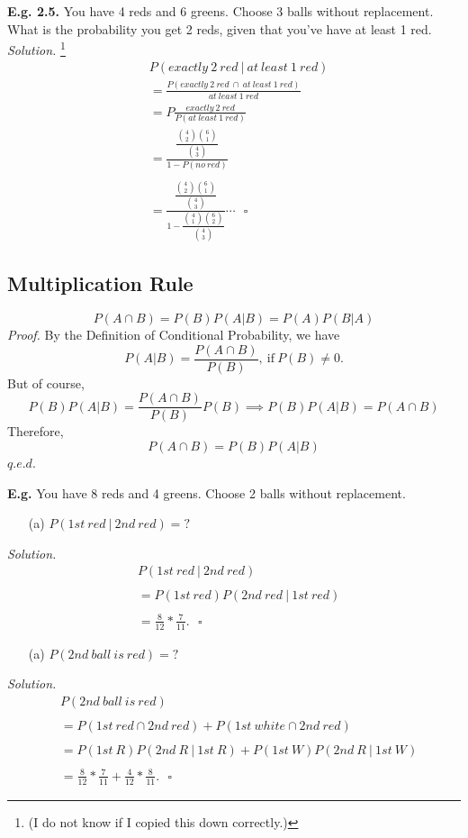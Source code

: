 \documentclass[12pt]{book}
\begin{document}
\noindent \textbf{E.g. 2.5. } You have 4 reds and 6 greens. Choose 3 balls without replacement. What is the probability you get 2 reds, given that you've have at least 1 red. \\
\textit{Solution. }\footnote{(I do not know if I copied this down correctly.)}
\begin{align*}
& P(exactly~2~red~|~at~least~1~red)\\
&= \frac{P(exactly~2~red~\cap~at~least~1~red)}{at~least~1~red}\\
&= P\frac{exactly~2~red}{P(at~least~1~red)}\\
&= \frac{\dfrac{{4\choose 2}{6\choose1}}{{4\choose3}}}{1-P(no~red)}\\\\
&= \frac{\dfrac{{4\choose 2}{6\choose1}}{{4\choose3}}}{1-\dfrac{{4\choose 1}{6\choose2}}{{4\choose3}}}\cdots~~~\square
\end{align*}


\subsection{Multiplication Rule}
$$\boxed{P(A\cap B)=P(B)P(A|B)=P(A)P(B|A)}$$
\textit{Proof. } By the Definition of Conditional Probability, we have
$$P(A|B)=\frac{P(A\cap B)}{P(B)},~\text{if}~P(B)\neq0.$$ 
But of course,
$$P(B)P(A|B)=\frac{P(A\cap B)}{P(B)}P(B)\implies{}P(B)P(A|B)=P(A\cap B)$$
Therefore, $$P(A\cap B)=P(B)P(A|B)$$\hfill$q.e.d.$

\noindent \textbf{E.g. } You have 8 reds and 4 greens. Choose 2 balls without replacement. 
\begin{itemize}\item [(a)] $P(1st~red~|~2nd~red)=?$ \end{itemize}
\textit{Solution. }
\begin{align*}
& P(1st~red~|~2nd~red)\\\\
&= P(1st~red)P(2nd~red~|~1st~red)\\\\
&= \frac{8}{12} * \frac{7}{11}.~~~\square
\end{align*}

\begin{itemize}\item [(a)] $P(2nd~ball~is~red)=?$ \end{itemize}
\textit{Solution. }
\begin{align*}
& P(2nd~ball~is~red)\\\\
&= P(1st~red\cap 2nd~red)+P(1st~white\cap 2nd~red)\\\\
&= P(1st~R)P(2nd~R~|~1st~R)+P(1st~W)P(2nd~R~|~1st~W)\\\\
&= \frac{8}{12}* \frac{7}{11} + \frac{4}{12} * \frac{8}{11}.~~~\square
\end{align*}
\end{document}
